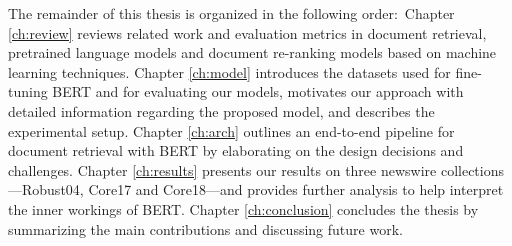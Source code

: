 The remainder of this thesis is organized in the following order:\
Chapter \ref{ch:review} reviews related work and evaluation metrics in document retrieval, pretrained language models and document re-ranking models based on machine learning techniques.
Chapter \ref{ch:model} introduces the datasets used for fine-tuning BERT and for evaluating our models, motivates our approach with detailed information regarding the proposed model, and describes the experimental setup.
Chapter \ref{ch:arch} outlines an end-to-end pipeline for document retrieval with BERT by elaborating on the design decisions and challenges.
Chapter \ref{ch:results} presents our results on three newswire collections---Robust04, Core17 and Core18---and provides further analysis to help interpret the inner workings of BERT.
Chapter \ref{ch:conclusion} concludes the thesis by summarizing the main contributions and discussing future work.